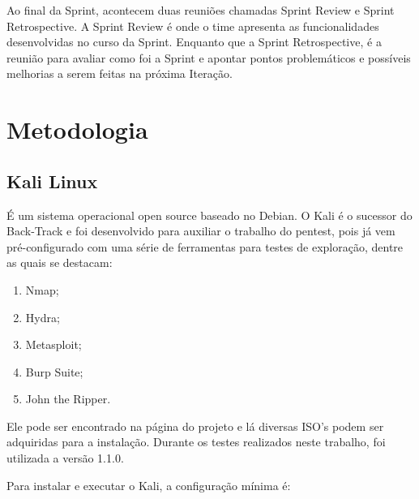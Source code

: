 \documentclass[
    12pt,               %
    openright,          %
    oneside,            %
    a4paper,            %
    section=TITLE,     %
    english,            %
    french,             %
    spanish,            %
    brazil              %
    ]{abntex2}
\newcommand{\citep}{\cite}
\begin{document}
Ao final da Sprint, acontecem duas reuniões chamadas Sprint Review e Sprint Retrospective. A Sprint Review é onde o time apresenta as funcionalidades desenvolvidas no curso da Sprint. Enquanto que a Sprint Retrospective, é a reunião para avaliar como foi a Sprint e apontar pontos problemáticos e possíveis melhorias a serem feitas na próxima Iteração.



\chapter{Metodologia}


\section{Kali Linux}

É um sistema operacional open source baseado no Debian. O Kali é o sucessor do Back-Track\citep{62218} e foi desenvolvido para auxiliar o trabalho do pentest, pois já vem pré-configurado com uma série de ferramentas para testes de exploração\citep{62219}, dentre as quais se destacam:



\begin{enumerate}[start=1]
	
\item Nmap;
	
\item Hydra;
	
\item Metasploit;
	
\item Burp Suite;
	
\item John the Ripper.

\end{enumerate}

Ele pode ser encontrado na página do projeto \citep{62216}e lá diversas ISO\rq{}s podem ser adquiridas para a instalação. Durante os testes realizados neste trabalho, foi utilizada a versão 1.1.0.


Para instalar e executar o Kali, a configuração mínima é:
\end{document}
